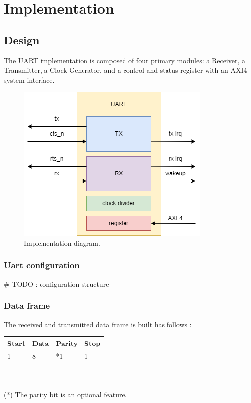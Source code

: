 \documentclass[12pt]{article}
\begin{document}
\section{Implementation}
\subsection{Design}
The UART implementation is composed of four primary modules: a Receiver, 
a Transmitter, a Clock Generator, and a control and status register with an 
AXI4 system interface.
\begin{figure}[h]
  \centering
  \includegraphics[scale=0.6]{UART_IMPL_DIAGRAM.png}
  \caption{Implementation diagram.}
\end{figure}

\subsubsection{Uart configuration}
\# TODO : configuration structure
\subsubsection{Data frame}
The received and transmitted data frame is built has follows : \\

\noindent \begin{tabular}{|p{3cm}|p{3cm}|p{3cm}|p{3cm}|}
  \hline
  \rowcolor{light-gray}\textbf{Start} & \textbf{Data} & \textbf{Parity} & \textbf{Stop} \\
  \hline
  1 & 8 & *1  & 1 \\
  \hline
\end{tabular} \\~\\
\noindent (*) The parity bit is an optional feature.
\end{document}
